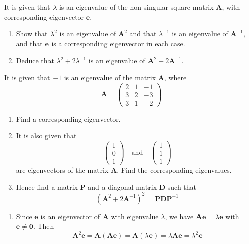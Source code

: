 \documentclass[leqno]{article}
\begin{document}
\begin{enumerate}[
  label=\textbf{\arabic*.},
  leftmargin=*,
  topsep=0pt,
  partopsep=0pt,
  parsep=0pt
]
It is given that $\lambda$ is an eigenvalue of the non-singular square matrix $\mathbf{A}$, with corresponding eigenvector $\mathbf{e}$. \\
\begin{enumerate}[label=\textbf{(\alph*)}]
  \item Show that $\lambda^{2}$ is an eigenvalue of $\mathbf{A}^{2}$ and that $\lambda^{-1}$ is an eigenvalue of $\mathbf{A}^{-1}$, and that $\mathbf{e}$ is a corresponding eigenvector in each case.  \\
  \item Deduce that $\lambda^{2} + 2\lambda^{-1}$ is an eigenvalue of $\mathbf{A}^{2} + 2\mathbf{A}^{-1}$.  \\
\end{enumerate}
It is given that $-1$ is an eigenvalue of the matrix $\mathbf{A}$, where
\[\mathbf{A} = \begin{pmatrix} 2 & 1 & -1 \\ 3 & 2 & -3 \\ 3 & 1 & -2 \end{pmatrix}\]
\begin{enumerate}[label=\textbf{(\alph*)}, resume]
  \item Find a corresponding eigenvector.  \\
  \item It is also given that
  \[\begin{pmatrix} 1 \\ 0 \\ 1 \end{pmatrix} \quad \text{and} \quad \begin{pmatrix} 1 \\ 1 \\ 1 \end{pmatrix}\]
  are eigenvectors of the matrix $\mathbf{A}$. Find the corresponding eigenvalues.  \\
  \item Hence find a matrix $\mathbf{P}$ and a diagonal matrix $\mathbf{D}$ such that
  \[\left(\mathbf{A}^{2} + 2\mathbf{A}^{-1}\right)^2 = \mathbf{P}\mathbf{D}\mathbf{P}^{-1}\] 
\end{enumerate}

\vspace*{10pt}

\begin{djsSolution}
\begin{enumerate}[label=\textbf{(\alph*)}, start=1]
  \item Since \(\mathbf{e}\) is an eigenvector of \(\mathbf{A}\) with eigenvalue \(\lambda\), we have \(\mathbf{A}\mathbf{e}=\lambda\mathbf{e}\) with \(\mathbf{e}\neq\mathbf{0}\). Then
\[
\mathbf{A}^2\mathbf{e}=\mathbf{A}(\mathbf{A}\mathbf{e})=\mathbf{A}(\lambda\mathbf{e})=\lambda\mathbf{A}\mathbf{e}=\lambda^2\mathbf{e}
\]


\end{enumerate}
\end{djsSolution}
\end{enumerate}
\end{document}

